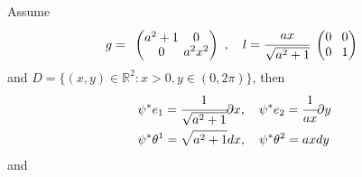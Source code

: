 \documentclass[10pt]{article}
\begin{document}
            \begin{example}
                Assume
                \begin{equation*}
                    \begin{aligned}
                        g = 
                        \begin{array}{lc}
                            \setlength{\arraycolsep}{2pt}
                            \begingroup
                            \renewcommand*{\arraystretch}{0.89}
                            \begin{pmatrix}
                                a^2+1 & 0 \\
                                0 & a^2x^2 \\
                            \end{pmatrix}
                            \endgroup
                        \end{array},
                        \quad
                        l = \cfrac{ax}{\sqrt{a^2+1}}
                        \begin{array}{lc}
                            \setlength{\arraycolsep}{4pt}
                            \begingroup
                            \renewcommand*{\arraystretch}{1}
                            \begin{pmatrix}
                                0 & 0 \\
                                0 & 1 \\
                            \end{pmatrix}
                            \endgroup
                        \end{array}
                    \end{aligned}
                \end{equation*}
                and $D = \{ (x,y)\in\mathbb{R}^2: x>0, y\in(0,2\pi) \}$, then
                \begin{equation*}
                    \begin{aligned}
                        &\psi^*e_1 = \cfrac{1}{\sqrt{a^2+1}}\partial x, \quad \psi^*e_2 = \cfrac{1}{ax}\partial y \\
                        &\psi^*\theta^1 = \sqrt{a^2+1}dx, \quad \psi^*\theta^2 = axdy
                    \end{aligned}
                \end{equation*}
                and
                \begin{equation*}
                    \begin{aligned}

\end{aligned}
\end{equation*}
\end{example}
\end{document}
